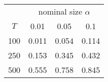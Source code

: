 % 
\begin{tabular}{cccc}
  \hline
  & \multicolumn{3}{c}{nominal size $\alpha$} \\
 $T$ & 0.01 & 0.05 & 0.1 \\
 \hline
100 & 0.011 & 0.054 & 0.114 \\ 
  250 & 0.153 & 0.345 & 0.432 \\ 
  500 & 0.555 & 0.758 & 0.845 \\ 
   \hline
\end{tabular}
